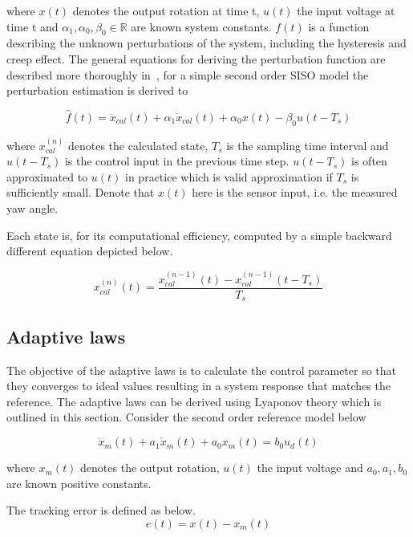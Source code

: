 where $x(t)$ denotes the output rotation at time t, $u(t)$ the input voltage at time t and $\alpha_1, \alpha_0, \beta_0 \in \mathbb{R}$ are known system constants. $f(t)$ is a function describing the unknown perturbations of the system, including the hysteresis and creep effect. The general equations for deriving the perturbation function are described more thoroughly in~\cite{Elmali:1996}, for a simple second order SISO model the perturbation estimation is derived to

\begin{equation}
  \label{eq:perturbation}
  \hat{f}(t) = \ddot{x}_{cal}(t) + \alpha_1\dot{x}_{cal}(t) +  \alpha_0x(t) - \beta_0u(t-T_s)
\end{equation}

where $x_{cal}^{(n)}$ denotes the calculated state, $T_s$ is the sampling time interval and $u(t-T_s)$ is the control input in the previous time step. $u(t-T_s)$ is often approximated to $u(t)$ in practice which is valid approximation if $T_s$ is sufficiently small. Denote that $x(t)$ here is the sensor input, i.e. the measured yaw angle.

Each state is, for its computational efficiency, computed by a simple backward different equation depicted below.

\begin{equation}
  \label{eq:backward}
  x_{cal}^{(n)}(t) = \frac{x_{cal}^{(n-1)}(t) - x_{cal}^{(n-1)}(t-T_s)}{T_s}
\end{equation}

\subsection{Adaptive laws}
The objective of the adaptive laws is to calculate the control parameter so that they converges to ideal values resulting in a system response that matches the reference. The adaptive laws can be derived using Lyaponov theory which is outlined in this section. Consider the second order reference model below

\begin{equation}
  \label{eq:refmodel}
  \ddot{x}_m(t) + a_1\dot{x}_m(t) +  a_0x_m(t) = b_0u_d(t)
\end{equation}

where $x_m(t)$ denotes the output rotation, $u(t)$ the input voltage and $a_0, a_1, b_0$ are known positive constants.

The tracking error is defined as below.
\begin{equation}
  \label{eq:stateerror}
  e(t) = x(t) - x_m(t)
\end{equation}

